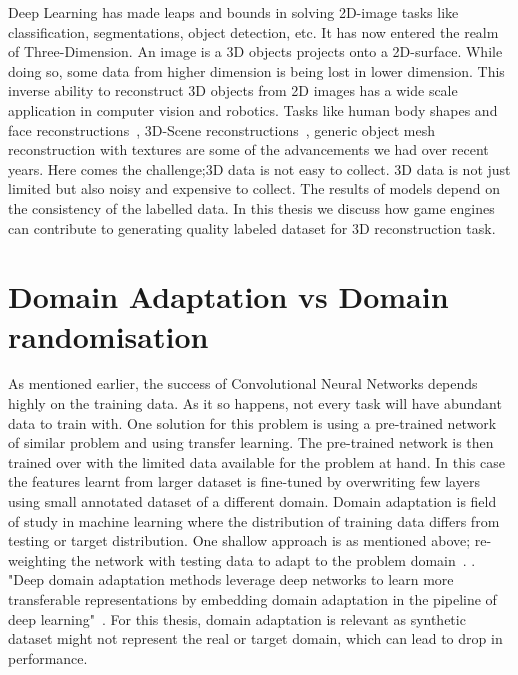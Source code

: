 Deep Learning has made leaps and bounds in solving 2D-image tasks like classification, segmentations, object detection, etc.
It has now entered the realm of Three-Dimension.
An image is a 3D objects projects onto a 2D-surface.
While doing so, some data from higher dimension is being lost in lower dimension.
This inverse ability to reconstruct 3D objects from 2D images has a wide scale application in computer vision and robotics.
Tasks like human body shapes and face reconstructions~\cite{deng2019accurate,Guo20173DFaceNetRD,9210569,richardson20163d,Richardson2017LearningDF},
3D-Scene reconstructions~\cite{Denninger20203DSR,Song2017SemanticSC,LiSilhouetteAssisted3O,Shin20193DSR}, generic object mesh reconstruction with textures are some of the advancements we had over recent years.
Here comes the challenge;3D data is not easy to collect.
3D data is not just limited but also noisy and expensive to collect.
The results of models depend on the consistency of the labelled data.
In this thesis we discuss how game engines can contribute to generating quality labeled dataset for 3D reconstruction task.

\section{Domain Adaptation vs Domain randomisation} \label{sec:da vs dr}

As mentioned earlier, the success of Convolutional Neural Networks depends highly on the training data.
As it so happens, not every task will have abundant data to train with.
One solution for this problem is using a pre-trained network of similar problem and using transfer learning.
The pre-trained network is then trained over with the limited data available for the problem at hand.
In this case the features learnt from larger dataset is fine-tuned by overwriting few layers using small annotated dataset of a different domain.
Domain adaptation is field of study in machine learning where the distribution of training data differs from testing or target distribution.
One shallow approach is as mentioned above;
re-weighting the network with testing data to adapt to the problem domain~\cite{Li2017PredictionRF}.
.
"Deep domain adaptation methods leverage deep networks to learn more transferable representations by embedding domain adaptation in the pipeline of
deep learning"~\cite{DBLP:journals/corr/abs-1802-03601}.
For this thesis, domain adaptation is relevant as synthetic dataset might not represent the real or target domain, which can lead to drop in performance.

